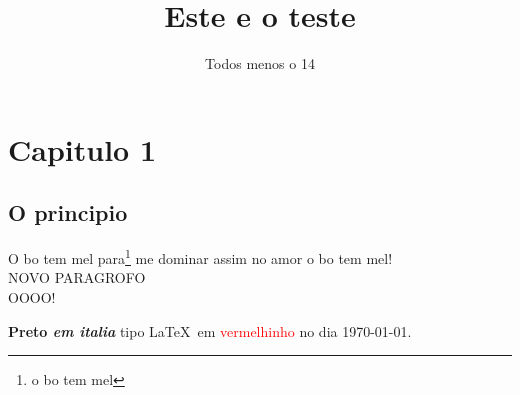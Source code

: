 \documentclass[11pt, a4paper, oneside]{article}
\title{Este e o teste}
\author{Todos menos o 14}
\begin{document}
\maketitle
\newpage


\section{Capitulo 1}
\subsection{O principio }
O bo tem mel para\footnote{o bo tem mel} me dominar assim no amor o bo tem mel!\\
 NOVO PARAGROFO\\
OOOO!\\


\begin{comment}o grande comentario da actualidade\end{comment}


\textbf{Preto \textit{em italia}} tipo \LaTeX\ em \textcolor{red}{vermelhinho} no dia \today.
\end{document}
